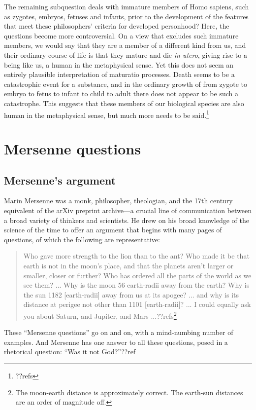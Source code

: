 The remaining subquestion deals with immature members of Homo sapiens, such as zygotes, embryos, fetuses and infants, prior to the
development of the features that meet these philosophers' criteria for developed personhood? Here, the questions become 
more controversial.
On a view that excludes such immature members, we would say that they are a member of a different kind from us, and
their ordinary course of life is that they mature and die \textit{in utero}, giving
rise to a being like us, a human in the metaphysical sense. Yet this does not seem an entirely plausible
interpretation of maturatio processes. Death seems to be a catastrophic event for a substance, and in the ordinary
growth of from zygote to embryo to fetus to infant to child to adult 
there does not appear to be such a catastrophe. This suggests that these members of our biological species are also human in the metaphysical sense, but much
more needs to be said.\footnote{??refs}

\section{Mersenne questions}
\subsection{Mersenne's argument}
Marin Mersenne was a monk, philosopher, theologian, and the 17th century equivalent of the arXiv preprint 
archive---a crucial line of communication between a broad variety of thinkers and scientists. He drew on his broad knowledge of
the science of the time to offer an argument that begins with many pages of questions, of which the following are
representative:
\begin{quote}
Who gave more strength to the lion than to the ant?
Who made it be that earth is not in the moon's place, and that the planets aren't larger or smaller, closer or further?
Who has ordered all the parts of the world as we see them?
...
Why is the moon 56 earth-radii away from the earth? Why is the sun 1182 [earth-radii] away from us at its apogee? ... and why is its distance at perigee not other than 1101 [earth-radii]? ...
I could equally ask you about Saturn, and Jupiter, and Mars ...??refs\footnote{The moon-earth distance is approximately correct. The earth-sun distances are an order of magnitude off.}
\end{quote}
These ``Mersenne questions'' go on and on, with a mind-numbing number of examples. And Mersenne has one answer to all
these questions, posed in a rhetorical question: ``Was it not God?''??ref

